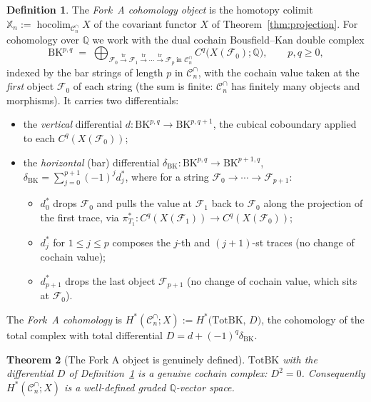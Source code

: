 \documentclass[11pt,oneside]{amsart}
\theoremstyle{plain}
\newtheorem{theorem}{Theorem}[section]
\theoremstyle{definition}
\newtheorem{definition}[theorem]{Definition}
\theoremstyle{remark}
\theoremstyle{honeststyle}
\newcommand{\F}{\mathcal{F}}
\newcommand{\Q}{\mathbb{Q}}
\newcommand{\Cn}{\mathcal{C}^{\cap}_n}
\newcommand{\Xbb}{\mathbb{X}}
\newcommand{\hocolim}{\operatorname*{hocolim}}
\newcommand{\tr}{\mathrm{tr}}
\newcommand{\BK}{\mathrm{BK}}
\newcommand{\Tot}{\mathrm{Tot}}
\begin{document}
\begin{definition}
\label{def:bk}
The \emph{Fork~A cohomology object} is the homotopy colimit
$\Xbb_n:=\hocolim_{\Cn}X$ of the covariant functor $X$ of
Theorem~\ref{thm:projection}. For cohomology over $\Q$ we work with the
dual cochain Bousfield--Kan double complex
\[
  \BK^{p,q}\;=\;\bigoplus_{\F_0\xrightarrow{\ \tr\ }\F_1\xrightarrow{\ \tr\ }
  \cdots\xrightarrow{\ \tr\ }\F_p\ \text{in }\Cn}
  C^{q}\bigl(X(\F_0);\Q\bigr),
  \qquad p,q\ge0,
\]
indexed by the bar strings of length $p$ in $\Cn$, with the cochain
value taken at the \emph{first} object $\F_0$ of each string (the sum
is finite: $\Cn$ has finitely many objects and morphisms). It carries
two differentials:
\begin{itemize}[leftmargin=1.6em]
\item the \emph{vertical} differential $d\colon\BK^{p,q}\to\BK^{p,q+1}$,
  the cubical coboundary applied to each $C^{q}(X(\F_0))$;
\item the \emph{horizontal} (bar) differential
  $\delta_{\BK}\colon\BK^{p,q}\to\BK^{p+1,q}$,
  $\delta_{\BK}=\sum_{j=0}^{p+1}(-1)^{j}d_j^{*}$, where for a string
  $\F_0\to\cdots\to\F_{p+1}$:
  \begin{itemize}[leftmargin=1.4em]
  \item $d_0^{*}$ drops $\F_0$ and pulls the value at $\F_1$ back to
    $\F_0$ along the projection of the first trace, via
    $\pi_{T_1}^{*}\colon C^{q}(X(\F_1))\to C^{q}(X(\F_0))$;
  \item $d_j^{*}$ for $1\le j\le p$ composes the $j$-th and
    $(j{+}1)$-st traces (no change of cochain value);
  \item $d_{p+1}^{*}$ drops the last object $\F_{p+1}$ (no change of
    cochain value, which sits at $\F_0$).
  \end{itemize}
\end{itemize}
The \emph{Fork~A cohomology} is
$H^{*}(\Cn;X):=H^{*}\bigl(\Tot\BK,\,D\bigr)$, the cohomology of the
total complex with total differential $D=d+(-1)^{q}\delta_{\BK}$.
\end{definition}

\begin{theorem}[The Fork A object is genuinely defined]
\label{thm:welldefined}
$\Tot\BK$ with the differential $D$ of Definition~\ref{def:bk} is a
genuine cochain complex: $D^2=0$. Consequently $H^{*}(\Cn;X)$ is a
well-defined graded $\Q$-vector space.
\end{theorem}
\end{document}
